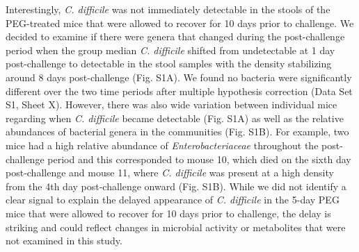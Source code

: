 \documentclass[
  11pt,
]{article}
\begin{document}
Interestingly, \emph{C. difficile} was not immediately detectable in the
stools of the PEG-treated mice that were allowed to recover for 10 days
prior to challenge. We decided to examine if there were genera that
changed during the post-challenge period when the group median \emph{C.
difficile} shifted from undetectable at 1 day post-challenge to
detectable in the stool samples with the density stabilizing around 8
days post-challenge (Fig. S1A). We found no bacteria were significantly
different over the two time periods after multiple hypothesis correction
(Data Set S1, Sheet X). However, there was also wide variation between
individual mice regarding when \emph{C. difficile} became detectable
(Fig. S1A) as well as the relative abundances of bacterial genera in the
communities (Fig. S1B). For example, two mice had a high relative
abundance of \emph{Enterobacteriaceae} throughout the post-challenge
period and this corresponded to mouse 10, which died on the sixth day
post-challenge and mouse 11, where \emph{C. difficile} was present at a
high density from the 4th day post-challenge onward (Fig. S1B). While we
did not identify a clear signal to explain the delayed appearance of
\emph{C. difficile} in the 5-day PEG mice that were allowed to recover
for 10 days prior to challenge, the delay is striking and could reflect
changes in microbial activity or metabolites that were not examined in
this study.
\end{document}
